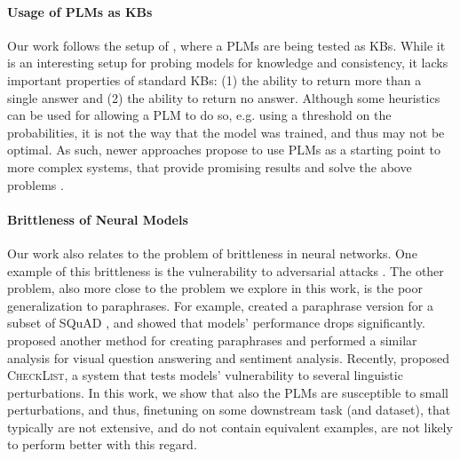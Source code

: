 \paragraph{Usage of PLMs as KBs}
Our work follows the setup of \citet{lama,alpaqa}, where a PLMs are being tested as KBs. While it is an interesting setup for probing models for knowledge and consistency, it lacks important properties of standard KBs: (1) the ability to return more than a single answer and (2) the ability to return no answer.
Although some heuristics can be used for allowing a PLM to do so, e.g. using a threshold on the probabilities, it is not the way that the model was trained, and thus may not be optimal.
As such, newer approaches propose to use PLMs as a starting point to more complex systems, that provide promising results and solve the above problems \cite{thorne2020neural}.


\paragraph{Brittleness of Neural Models}
Our work also relates to the problem of brittleness in neural networks. One example of this brittleness is the vulnerability to adversarial attacks \cite{adversarial_attacks,jia2017adversarial}.
The other problem, also more close to the problem we explore in this work, is the poor generalization to paraphrases.
For example, \citet{squad-paraphrase} created a paraphrase version for a subset of SQuAD \cite{squad}, and showed that models' performance drops significantly. 
\citet{ribeiro2018semantically} proposed another method for creating paraphrases and performed a similar analysis for visual question answering and sentiment analysis. Recently, \citet{ribeiro-etal-2020-beyond} proposed \textsc{CheckList}, a system that tests models' vulnerability to several linguistic perturbations.
In this work, we show that also the PLMs are susceptible to small perturbations, and thus, finetuning on some downstream task (and dataset), that typically are not extensive, and do not contain equivalent examples, are not likely to perform better with this regard.

